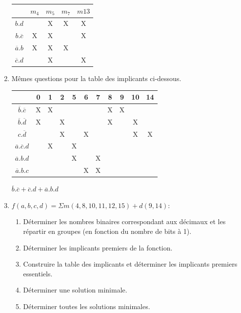 \documentclass[a4paper,10pt]{exam}
\begin{document}
\begin{enumerate}
      \begin{center}
      \begin{tabular}{c|c|c|c|c|}
                       & $m_4$& $m_5$ & $m_7$ & $m13$\\
                       \hline
        $b.d$           &   & X & X & X \\
        $b.\overline{c}$& X & X &   & X \\
        $\overline{a}.b$& X & X & X &   \\
        $\overline{c}.d$&   & X &   & X
      \end{tabular}
      \end{center}
    \item Mêmes questions pour la table des implicants ci-dessous.
      \begin{center}
      \begin{tabular}{c|c|c|c|c|c|c|c|c|c|c|}
                                   &0&1&2&5&6&7&8&9&10&14\\
                                   \hline
        $\overline{b}.\overline{c}$ &X&X& & & & &X&X&  &  \\
        $\overline{b}.\overline{d}$ &X& &X& & & &X& &X &  \\
        $c.\overline{d}$            & & &X& &X& & & &X &X \\
        $\overline{a}.\overline{c}.d$& &X& &X& & & & &  &  \\
        $\overline{a}.b.d$           & & & &X& &X& & &  &  \\
        $\overline{a}.b.c$           & & & & &X&X& & &  &
      \end{tabular}
      \end{center}

      \begin{solution}
        $\overline{b}.\overline{c} + \overline{c}.d + \overline{a}.b.d$
      \end{solution}

    \item $f(a,b,c,d)=\Sigma m(4,8,10,11,12,15) + d(9,14)$:
      \begin{enumerate}
        \item Déterminer les nombres binaires correspondant aux décimaux et les
          répartir en groupes (en fonction du nombre de bits à 1).
        \item Déterminer les implicants premiers de la fonction.
        \item Construire la table des implicants et déterminer les implicants
          premiers essentiels.
        \item Déterminer une solution minimale.
        \item Déterminer toutes les solutions minimales.
      \end{enumerate}


\end{enumerate}
\end{document}
